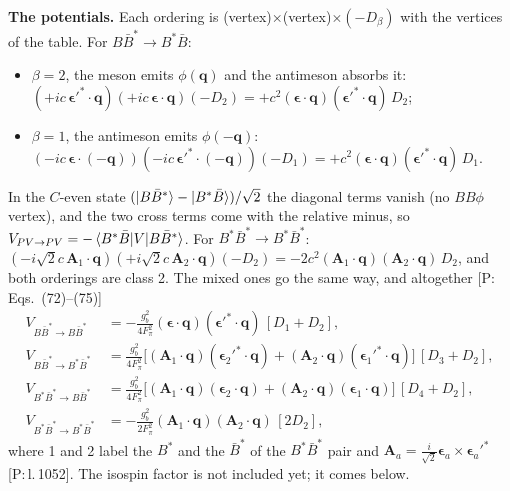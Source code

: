 \documentclass[11pt]{article}
\newcommand{\tagP}[1]{\textcolor{blue!65!black}{\textsf{\small[P:\,#1]}}}
\newenvironment{aiadd}{\par}{\par}
\begin{document}
\begin{aiadd}
	\textbf{The potentials.} Each ordering is (vertex)$\times$(vertex)$\times(-D_\beta)$ with the vertices of the table. For $B\bar B^*\to B^*\bar B$:
	\begin{itemize}
		\item $\beta=2$, the meson emits $\phi(\bm q)$ and the antimeson absorbs it: $(+ic\,\bm\epsilon'^*\cdot\bm q)(+ic\,\bm\epsilon\cdot\bm q)(-D_2)=+c^2(\bm\epsilon\cdot\bm q)(\bm\epsilon'^*\cdot\bm q)\,D_2$;
		\item $\beta=1$, the antimeson emits $\phi(-\bm q)$: $(-ic\,\bm\epsilon\cdot(-\bm q))(-ic\,\bm\epsilon'^*\cdot(-\bm q))(-D_1)=+c^2(\bm\epsilon\cdot\bm q)(\bm\epsilon'^*\cdot\bm q)\,D_1$.
	\end{itemize}
	In the $C$-even state $(\ket{B\bar B^*}-\ket{B^*\bar B})/\sqrt2$ the diagonal terms vanish (no $BB\phi$ vertex), and the two cross terms come with the relative minus, so $V_{PV\to PV}=-\braket{B^*\bar B|V|B\bar B^*}$. For $B^*\bar B^*\to B^*\bar B^*$: $(-i\sqrt2c\,\bm A_1\cdot\bm q)(+i\sqrt2c\,\bm A_2\cdot\bm q)(-D_2)=-2c^2(\bm A_1\cdot\bm q)(\bm A_2\cdot\bm q)\,D_2$, and both orderings are class 2. The mixed ones go the same way, and altogether \tagP{Eqs.~(72)--(75)}
	\begin{align*}
		V_{B\bar B^*\to B\bar B^*}     & =-\frac{g_b^2}{4F_\pi^2}(\bm\epsilon\cdot\bm q)(\bm\epsilon'^*\cdot\bm q)\,[D_1+D_2],                                                        \\
		V_{B\bar B^*\to B^*\bar B^*}   & =\frac{g_b^2}{4F_\pi^2}\big[(\bm A_1\cdot\bm q)(\bm\epsilon_2'^*\cdot\bm q)+(\bm A_2\cdot\bm q)(\bm\epsilon_1'^*\cdot\bm q)\big]\,[D_3+D_2], \\
		V_{B^*\bar B^*\to B\bar B^*}   & =\frac{g_b^2}{4F_\pi^2}\big[(\bm A_1\cdot\bm q)(\bm\epsilon_2\cdot\bm q)+(\bm A_2\cdot\bm q)(\bm\epsilon_1\cdot\bm q)\big]\,[D_4+D_2],       \\
		V_{B^*\bar B^*\to B^*\bar B^*} & =-\frac{g_b^2}{2F_\pi^2}(\bm A_1\cdot\bm q)(\bm A_2\cdot\bm q)\,[2D_2],
	\end{align*}
	where 1 and 2 label the $B^*$ and the $\bar B^*$ of the $B^*\bar B^*$ pair and $\bm A_a=\frac{i}{\sqrt2}\bm\epsilon_a\times\bm\epsilon_a'^*$ \tagP{l.\,1052}. The isospin factor is not included yet; it comes below.
\end{aiadd}
\end{document}

